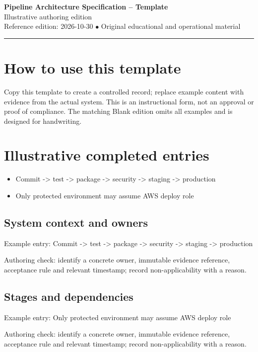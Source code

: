 \documentclass[10pt,letterpaper]{article}
\begin{document}
\begin{center}
{\LARGE\bfseries\color{cdblue}Pipeline Architecture Specification -- Template}\\[7pt]
{\large Illustrative authoring edition}\\[6pt]
{\small Reference edition: 2026-10-30 $\bullet$ Original educational and operational material}
\end{center}
\noindent\color{cdblue}\rule{\linewidth}{1.2pt}\color{black}
\vspace{0.4em}
\section{How to use this template}
Copy this template to create a controlled record; replace example content with evidence from the actual system. This is an instructional form, not an approval or proof of compliance. The matching Blank edition omits all examples and is designed for handwriting.


\section{Illustrative completed entries}
\begin{itemize}
\item Commit -> test -> package -> security -> staging -> production
\item Only protected environment may assume AWS deploy role
\end{itemize}

\subsection{System context and owners}
Example entry: Commit -> test -> package -> security -> staging -> production

Authoring check: identify a concrete owner, immutable evidence reference, acceptance rule and relevant timestamp; record non-applicability with a reason.


\subsection{Stages and dependencies}
Example entry: Only protected environment may assume AWS deploy role

Authoring check: identify a concrete owner, immutable evidence reference, acceptance rule and relevant timestamp; record non-applicability with a reason.
\end{document}
